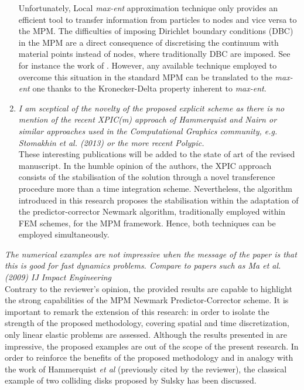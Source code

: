 \documentclass[12pt]{article}
\begin{document}
\begin{enumerate}
Unfortunately, Local \textit{max-ent} approximation technique only provides an efficient tool to transfer information from particles to nodes and vice versa to the MPM. The difficulties of imposing Dirichlet boundary conditions (DBC) in the MPM are a direct consequence of discretising the continuum with material points instead of nodes, where traditionally DBC are imposed. See for instance the work of \cite{Cortis_et_al_2017_IJNME}. However, any available technique employed to overcome this situation in the standard MPM can be translated to the \textit{max-ent} one thanks to the Kronecker-Delta property inherent to \textit{max-ent}.

\item \textit{I am sceptical of the novelty of the proposed explicit scheme as there is no mention of the recent XPIC(m) approach of Hammerquist and Nairn or similar approaches used in the Computational Graphics community, e.g. Stomakhin et al. (2013) or the more recent Polypic.}\\

These interesting publications will be added to the state of art of the revised manuscript. In the humble opinion of the authors, the XPIC approach consists of the stabilisation of the solution through a novel transference procedure more than a time integration scheme. Nevertheless, the algorithm introduced in this research proposes the stabilisation within the adaptation of the predictor-corrector Newmark algorithm, traditionally employed within FEM schemes, for the MPM framework. Hence, both techniques can be employed simultaneously.

\end{enumerate}

 \textit{The numerical examples are not impressive when the message of the paper is that this is good for fast dynamics problems. Compare to papers such as Ma et al. (2009) IJ Impact Engineering}\\

Contrary to the reviewer's opinion, the provided results are capable to highlight the strong capabilities of the MPM Newmark Predictor-Corrector scheme. It is important to remark the extension of this research: in order to isolate the strength of the proposed methodology, covering spatial and time discretization, only linear elastic problems are assessed. Although the results presented in \cite{MA2009272} are impressive, the proposed examples are out of the scope of the present research. In order to reinforce the benefits of the proposed methodology and in analogy with the work of Hammerquist \textit{et al} \cite{HAMMERQUIST2017724} (previously cited by the reviewer), the classical example of two colliding disks proposed by Sulsky has been discussed. 
\end{document}
